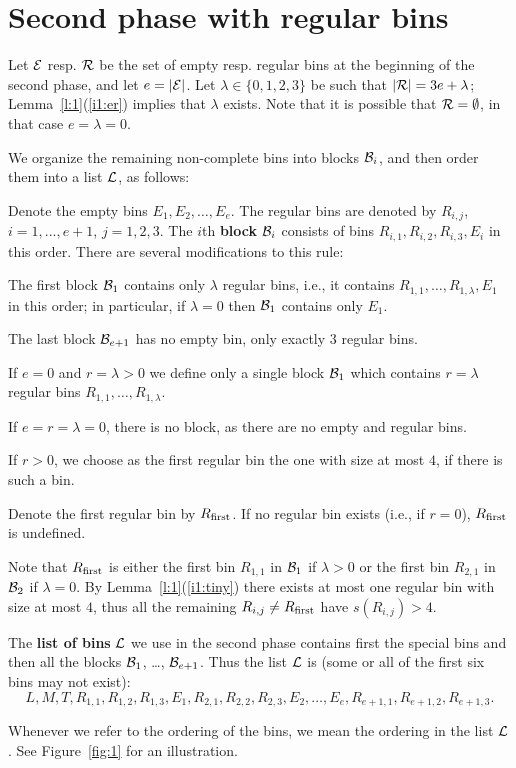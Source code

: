 \section{Second phase with regular bins}

Let ${\mathcal E}$ resp. ${\mathcal R}$ be the set of empty resp. regular bins at
the beginning of the second phase, and let $e=|{\mathcal E}|$. Let
$\lambda\in\{0,1,2,3\}$ be such that $|{\mathcal R}|=3e+\lambda$;
Lemma~\ref{l:1}(\ref{i1:er}) implies that $\lambda$ exists. Note
that it is possible that ${\mathcal R}=\emptyset$, in that case $e=\lambda=0$.

We organize the remaining non-complete bins into blocks ${\mathcal B}_i$, and
then order them into a list ${\mathcal L}$, as follows:

\begin{dfn}\label{d:blocks}
Denote the empty bins $E_1, E_2, \dots, E_e$.  The regular
bins are denoted by $R_{i,j}$, $i=1,...,e+1$, $j=1,2,3$. The $i$th
\textbf{block} ${\mathcal B}_i$ consists of bins $R_{i,1},R_{i,2},R_{i,3},E_i$ in this
order. There are several modifications to this rule:
\begin{compactenum}[\rm (1)] 
\item The first block ${\mathcal B}_1$ contains
only $\lambda$ regular bins, i.e., it contains $R_{1,1},\ldots,R_{1,\lambda},E_1$ in this
order; in particular, if $\lambda=0$ then ${\mathcal B}_1$ contains only
$E_1$.

\item The last block ${\mathcal B}_{e+1}$ has no empty bin,
only exactly $3$ regular bins. 

\item If $e=0$ and $r=\lambda>0$ we define only a single block ${\mathcal B}_1$
which contains $r=\lambda$ regular bins $R_{1,1},\ldots,R_{1,\lambda}$. 

\item If $e=r=\lambda=0$, there is no block, as there are no empty and
  regular bins. 

\item  If $r>0$, we choose as the first regular bin the one with
size at most $4$, if there is such a bin. 
\end{compactenum}
Denote the first regular bin by $R_{\mbox{\rm\scriptsize first}}$.  If no regular bin exists
(i.e., if $r=0$), $R_{\mbox{\rm\scriptsize first}}$ is undefined.
\end{dfn}
Note that $R_{\mbox{\rm\scriptsize first}}$ is either the first bin $R_{1,1}$ in ${\mathcal B}_1$ if
$\lambda>0$ or the first bin $R_{2,1}$ in ${\mathcal B}_2$ if $\lambda=0$. By
Lemma~\ref{l:1}(\ref{i1:tiny}) there exists at most one regular bin
with size at most $4$, thus all the remaining $R_{i,j}\neq R_{\mbox{\rm\scriptsize first}}$ have
$s(R_{i,j})>4$.
\begin{dfn}\label{d:list}
The \textbf{list of bins} ${\mathcal L}$ we use in the second phase contains first the
special bins and then all the blocks ${\mathcal B}_1$, \ldots, ${\mathcal B}_{e+1}$.
Thus the list ${\mathcal L}$ is (some or all of the first six bins may not
exist):
\[
L, M, T, R_{1,1}, R_{1,2}, R_{1,3}, E_1, R_{2,1}, R_{2,2}, R_{2,3},
E_2, \dots,
E_e,  R_{e+1,1}, R_{e+1,2}, R_{e+1,3}.
\]
\end{dfn}
Whenever we refer to the ordering of the bins, we mean the ordering in
the list ${\mathcal L}$. See Figure~\ref{fig:1} for an illustration.

